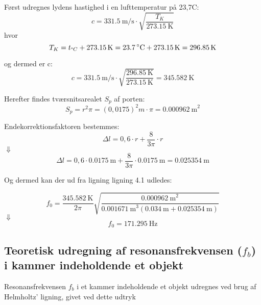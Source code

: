 Først udregnes lydens hastighed i en lufttemperatur på 23,7\degree C:
\begin{equation}
		c = {\SI{331,5}{\meter / \second}} \cdot \sqrt{\frac{T_{K}}{\SI{273,15}{\kelvin}}}	\end{equation}
 hvor 		
\begin{equation}
		T_{K} = t_{\degree C} + {\SI{273,15}{\kelvin}} = {\SI{23,7}{\degree C}} + {\SI{273,15}{\kelvin}} = {\SI{296,85}{\kelvin}}	
\end{equation}

og dermed er c: 
\begin{equation}
		c = {\SI{331,5}{\meter / \second}} \cdot \sqrt{\frac{\SI{296,85}{\kelvin}}{\SI{273,15}{\kelvin}}} = {\SI{345,582}{\kelvin}}	\end{equation}
		
Herefter findes tværsnitsarealet $S_{p}$ af porten:
\begin{equation}
		S_{p} = r^2\pi = (0,0175)^2 m \cdot \pi	= {\SI{0,000962}{\meter}^2}
\end{equation}

Endekorrektionsfaktoren bestemmes: 
\begin{equation}
		\Delta l = 0,6 \cdot r + \frac{8}{3\pi} \cdot r 
\end{equation} 
$\Downarrow$
\begin{equation}
\Delta l = 0,6 \cdot {\SI{0,0175}{\meter}} + \frac{8}{3\pi} \cdot {\SI{0,0175}{\meter}} = {\SI{0.025354}{\meter}} 
\end{equation}
		
Og dermed kan der ud fra ligning ligning 4.1 udledes: 

\begin{equation}
		f_{0} = \frac{{\SI{345,582}{\kelvin}}}{2\pi}\sqrt{\frac{{\SI{0,000962}{\meter}^2}}{{\SI{0,001671}{\meter}^3}({\SI{0,034}{\meter}}+ {\SI{0.025354}{\meter}})}}
\end{equation}	
$\Downarrow$
\begin{equation}
		f_{0} = {\SI{171,295}{\hertz}}
		\end{equation}

\subsection{Teoretisk udregning af resonansfrekvensen ($f_{b}$) i kammer indeholdende et objekt}

Resonansfrekvensen $f_{b}$ i et kammer indeholdende et objekt udregnes ved brug af Helmholtz' ligning, givet ved dette udtryk \fb

